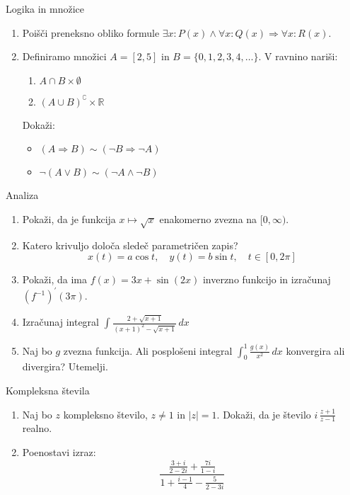 \begin{frame}{Logika in množice}
	\begin{enumerate}
		\item
		Poišči preneksno obliko formule $\exists x : P(x) \wedge \forall x : Q(x) \Rightarrow \forall x : R(x).$
		\item 
		Definiramo množici $A = [2,5]$ in $B = \{0,1,2,3,4,\dots\}$.
		V ravnino nariši:
		\begin{enumerate}
		   \item $A\cap B \times \emptyset $
		   \item $(A\cup B)^{\complement} \times \mathbb{R}$
		\end{enumerate}
		Dokaži:
		\begin{itemize}
			\item $(A\Rightarrow B) \sim (\lnot B\Rightarrow \lnot A)$
			\item $\lnot (A\lor B) \sim (\lnot A \land \lnot B)$
		\end{itemize}
	\end{enumerate}
\end{frame}

\begin{frame}{Analiza}
	\begin{enumerate}
		\item
		Pokaži, da je funkcija $x\mapsto \sqrt{x}$ enakomerno zvezna na $[0,\infty )$.
		\item 
		Katero krivuljo določa sledeč parametričen zapis?
		$$
		   x(t) = a \cos t,\quad %
		   y(t) = b \sin t,\quad %
		   t \in [0, 2 \pi]
		$$ 
		\item
		Pokaži, da ima $f(x) = 3x + \sin(2x)$ inverzno funkcijo in izračunaj $(f^{-1})^\prime(3\pi).$
		
		\item
		Izračunaj integral 
		$\displaystyle \int_{}^{} \frac{2+\sqrt{x+1}}{(x+1)^2-\sqrt{x+1}} \,dx $
		\item 
		Naj bo $g$ zvezna funkcija. Ali posplošeni integral 
		$\int_{0}^{1} \frac{g(x)}{x^2} \,dx $
		konvergira ali divergira? Utemelji.
	\end{enumerate}
\end{frame}

\begin{frame}{Kompleksna števila}
	\begin{enumerate}
		\item
		Naj bo $z$ kompleksno število, $z \ne 1$ in $|z| = 1$.
		Dokaži, da je število \( i \, \frac{z+1}{z-1} \) realno.
		\item
		Poenostavi izraz:
		$$
		\frac{\displaystyle \frac{3 + i}{2 - 2i} + \displaystyle \frac{7i}{1 - i}}{1 + \displaystyle \frac{i - 1}{4} - \displaystyle \frac{5}{2 - 3i}}
		$$
	\end{enumerate}
\end{frame}